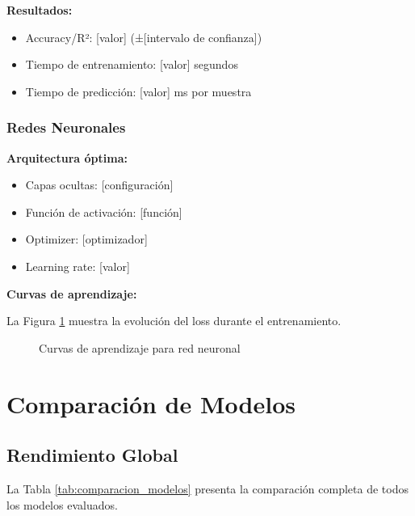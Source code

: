 \textbf{Resultados:}
\begin{itemize}
    \item Accuracy/R²: [valor] (±[intervalo de confianza])
    \item Tiempo de entrenamiento: [valor] segundos
    \item Tiempo de predicción: [valor] ms por muestra
\end{itemize}

\subsubsection{Redes Neuronales}

\textbf{Arquitectura óptima:}
\begin{itemize}
    \item Capas ocultas: [configuración]
    \item Función de activación: [función]
    \item Optimizer: [optimizador]
    \item Learning rate: [valor]
\end{itemize}

\textbf{Curvas de aprendizaje:}

La Figura \ref{fig:curvas_aprendizaje} muestra la evolución del loss durante el entrenamiento.

\begin{figure}[htbp]
\centering
\caption{Curvas de aprendizaje para red neuronal}
\label{fig:curvas_aprendizaje}
\end{figure}

\section{Comparación de Modelos}

\subsection{Rendimiento Global}

La Tabla \ref{tab:comparacion_modelos} presenta la comparación completa de todos los modelos evaluados.

